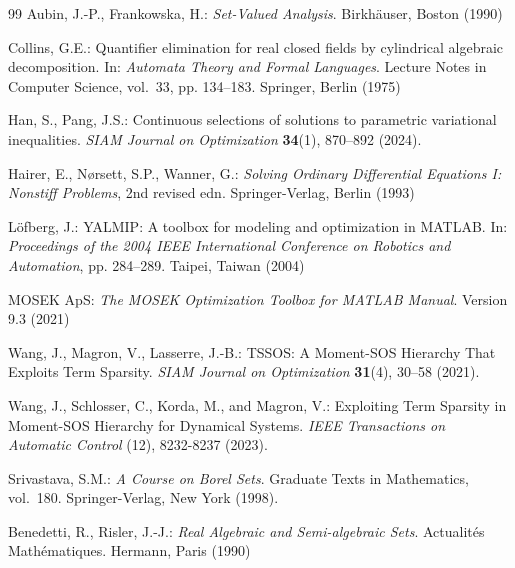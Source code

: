 \documentclass[sn-basic,Numbered]{sn-jnl}
\theoremstyle{thmstyleone}%
\begin{document}
\begin{thebibliography}{99}
Aubin, J.-P., Frankowska, H.: \emph{Set-Valued Analysis}. Birkh\"{a}user, Boston (1990)

Collins, G.E.: Quantifier elimination for real closed fields by cylindrical algebraic decomposition. In: \emph{Automata Theory and Formal Languages}. Lecture Notes in Computer Science, vol.~33, pp. 134--183. Springer, Berlin (1975)

Han, S., Pang, J.S.: Continuous selections of solutions to parametric variational inequalities. \emph{SIAM Journal on Optimization} \textbf{34}(1), 870--892 (2024). 

Hairer, E., N{\o}rsett, S.P., Wanner, G.: \emph{Solving Ordinary Differential Equations I: Nonstiff Problems}, 2nd revised edn. Springer-Verlag, Berlin (1993)

L\"{o}fberg, J.: {YALMIP}: A toolbox for modeling and optimization in {MATLAB}. In: \emph{Proceedings of the 2004 IEEE International Conference on Robotics and Automation}, pp. 284--289. Taipei, Taiwan (2004)

MOSEK ApS: \emph{The MOSEK Optimization Toolbox for MATLAB Manual}. Version 9.3 (2021)

Wang, J., Magron, V., Lasserre, J.-B.: {TSSOS}: A Moment-{SOS} Hierarchy That Exploits Term Sparsity. \emph{SIAM Journal on Optimization} \textbf{31}(4), 30--58 (2021). 

Wang, J., Schlosser, C., Korda, M., and Magron, V.: Exploiting Term Sparsity in Moment-{SOS} Hierarchy for Dynamical Systems. \emph{IEEE Transactions on Automatic Control} (12), 8232-8237 (2023).

Srivastava, S.M.: \emph{A Course on Borel Sets}. Graduate Texts in Mathematics, vol.~180. Springer-Verlag, New York (1998). 

Benedetti, R., Risler, J.-J.: \emph{Real Algebraic and Semi-algebraic Sets}. Actualit\'es Math\'ematiques. Hermann, Paris (1990)

\end{thebibliography}
\end{document}
